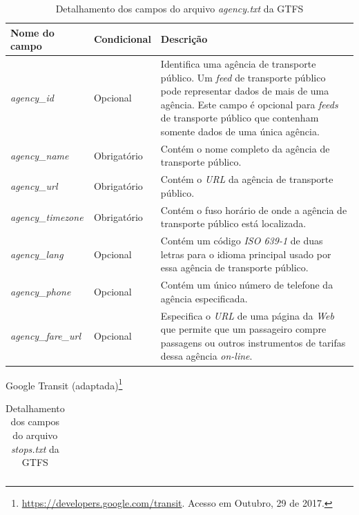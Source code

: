 \documentclass[
	12pt,				%
	oneside,			%
	a4paper,			%
	english,			%
	brazil				%
	]{abntex2ppgsi}
\begin{document}
{{\begin{apendicesenv}
\begin{table}[!htb]
\centering
  \caption{Detalhamento dos campos do arquivo \textit{agency.txt} da GTFS}
      \label{tab:gtfsAgency}
\begin{tabular}{>{\centering\arraybackslash}m{3.5cm} | >{\centering}m{3cm} | >{\centering\arraybackslash}m{8cm}}
\hline
\textbf{Nome do campo} & \textbf{Condicional} & \textbf{Descrição} \\
\hline
\textit{agency\_id} & Opcional & Identifica uma agência de transporte público. Um \textit{feed} de transporte público pode representar dados de mais de uma agência. Este campo é opcional para \textit{feeds} de transporte público que contenham somente dados de uma única agência. \\
\hline
\textit{agency\_name} & Obrigatório & Contém o nome completo da agência de transporte público. \\
\hline
\textit{agency\_url} & Obrigatório & Contém o \textit{URL} da agência de transporte público. \\
\hline
\textit{agency\_timezone} & Obrigatório & Contém o fuso horário de onde a agência de transporte público está localizada. \\
\hline
\textit{agency\_lang} & Opcional & Contém um código \textit{ISO 639-1} de duas letras para o idioma principal usado por essa agência de transporte público. \\
\hline
\textit{agency\_phone} & Opcional & Contém um único número de telefone da agência especificada. \\
\hline
\textit{agency\_fare\_url} & Opcional & Especifica o \textit{URL} de uma página da \textit{Web} que permite que um passageiro compre passagens ou outros instrumentos de tarifas dessa agência \textit{on-line}. \\
\hline
\end{tabular}
\end{table}
\vspace{-\baselineskip}
 Google Transit (adaptada)\footnote{\label{gtfsFields}\url{https://developers.google.com/transit}. Acesso em Outubro, 29 de 2017.}

\clearpage

\begin{longtable}[!htb]{>{\centering\arraybackslash}m{3.8cm} | >{\centering}m{2.5cm} | >{\centering\arraybackslash}m{8.5cm}}
  \caption{Detalhamento dos campos do arquivo \textit{stops.txt} da GTFS}
      \label{tab:gtfsStops} \\


\end{longtable}
\end{apendicesenv}}}
\end{document}

